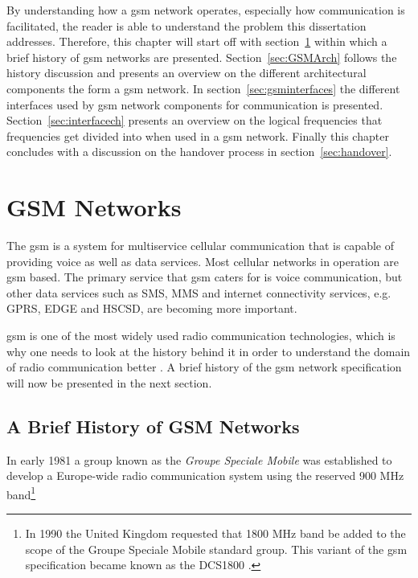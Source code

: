 By understanding how a \gls{gsm} network operates, especially how communication is facilitated, the reader is able to understand the problem this dissertation addresses. Therefore, this chapter will start off with section~\ref{sec:GSMNet} within which a brief history of \gls{gsm} networks are presented. Section~\ref{sec:GSMArch} follows the history discussion and presents an overview on the different architectural components the form a \gls{gsm} network. In section~\ref{sec:gsminterfaces} the different interfaces used by \gls{gsm} network components for communication is presented. Section~\ref{sec:interfacech} presents an overview on the logical frequencies that frequencies get divided into when used in a \gls{gsm} network. Finally this chapter concludes with a discussion on the handover process in section~\ref{sec:handover}.

\section{GSM Networks}
\label{sec:GSMNet}
The \gls{gsm} is a system for multiservice cellular communication that is capable of providing voice as well as data services\cite{GSMArchitectureProtocolsServices,wirelesstelcoMullet}. Most cellular networks in operation are \gls{gsm} based\cite{Karen2004,wirelesstelcoMullet}. The primary service that \gls{gsm} caters for is voice communication, but other data services such as \gls{SMS}, \gls{MMS} and internet connectivity services, e.g. \gls{GPRS}, \gls{EDGE} and \gls{HSCSD}, are becoming more important\cite{GSMArchitectureProtocolsServices,Eisenblatter}.

\Gls{gsm} is one of the most widely used radio communication technologies, which is why one needs to look at the history behind it in order to understand the domain of radio communication better \cite{GSMArchitectureProtocolsServices}. A brief history of the \gls{gsm} network specification will now be presented in the next section.

\subsection{A Brief History of GSM Networks}
\label{sec:gsmhistory}
In early 1981 a group known as the \emph{Groupe Speciale Mobile} was established to develop a Europe-wide radio communication system using the reserved 900 MHz band\footnote{In 1990 the United Kingdom requested that 1800 MHz band be added to the scope of the Groupe Speciale Mobile standard group. This variant of the \gls{gsm} specification became known as the \gls{DCS1800} \cite{GSM92,Karen2004}.}


